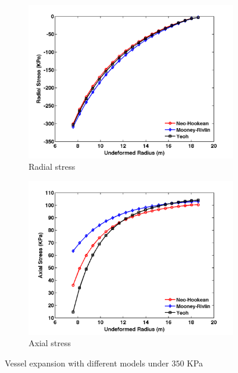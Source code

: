 \begin{figure}[H]
	\begin{subfigure}[b]{0.5\textwidth}
		\centering
		\includegraphics[width=\textwidth]{./figures/radial_models.png}
		\caption{Radial stress}
		\label{radial_models}
	\end{subfigure}
	\begin{subfigure}[b]{0.5\textwidth}
		\centering
		\includegraphics[width=\textwidth]{./figures/axial_models.png}
		\caption{Axial stress}
		\label{axial_models}
	\end{subfigure}
	\caption{Vessel expansion with different models under $350$ KPa}
	\label{fig:models}
\end{figure}

















